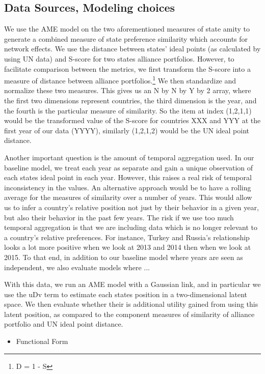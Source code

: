 \subsection{Data Sources, Modeling choices}
We use the AME model on the two aforementioned measures of state amity to generate a combined measure of state preference similarity which accounts for network effects. We use the distance between states' ideal points (as calculated by \citet{voeten:XXXX} using UN data) and S-score for two states alliance portfolios. However, to facilitate comparison between the metrics, we first transform the S-score into a measure of distance between alliance portfolios.\footnote{D = 1 - S} We then standardize and normalize these two measures. This gives us an N by N by Y by 2 array, where the first two dimensions represent countries, the third dimension is the year, and the fourth is the particular measure of similarity. So the item at index (1,2,1,1) would be the transformed value of the S-score for countries XXX and YYY at the first year of our data (YYYY), similarly (1,2,1,2) would be the UN ideal point distance.

Another important question is the amount of temporal aggregation used. In our baseline model, we treat each year as separate and gain a unique observation of each states ideal point in each year. However, this raises a real risk of temporal inconsistency in the values. An alternative approach would be to have a rolling average for the measures of similarity over a number of years. This would allow us to infer a country's relative position not just by their behavior in a given year, but also their behavior in the past few years. The risk if we use too much temporal aggregation is that we are including data which is no longer relevant to a country's relative preferences. For instance, Turkey and Russia's relationship looks a lot more positive when we look at 2013 and 2014 then when we look at 2015. To that end, in addition to our baseline model where years are seen as independent, we also evaluate models where ... 

With this data, we run an AME model with a Gaussian link, and in particular we use the uDv term to estimate each states position in a two-dimensional latent space. We then evaluate whether their is additional utility gained from using this latent position, as compared to the component measures of similarity of alliance portfolio and UN ideal point distance.
\begin{itemize}
\item Functional Form
\end{itemize}
